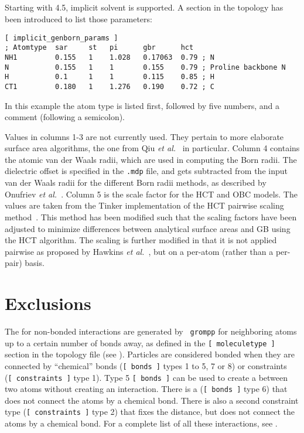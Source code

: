 \subsection{}
Starting with {\gromacs} 4.5, implicit solvent is supported. A section in the
topology has been introduced to list those parameters:

{\small
\begin{verbatim}
[ implicit_genborn_params ]
; Atomtype  sar     st   pi      gbr      hct
NH1         0.155   1    1.028   0.17063  0.79 ; N
N           0.155   1    1       0.155    0.79 ; Proline backbone N
H           0.1     1    1       0.115    0.85 ; H
CT1         0.180   1    1.276   0.190    0.72 ; C
\end{verbatim}}

In this example the atom type is listed first, followed by five
numbers, and a comment (following a semicolon).

Values in columns 1-3 are not currently used. They pertain to more
elaborate surface area algorithms, the one from Qiu {\em et al.}~\cite{Still97} in
particular.  Column 4 contains the atomic van der Waals radii, which are used
in computing the Born radii. The dielectric offset is specified in
the {\tt *.mdp} file, and gets subtracted from the input van der Waals radii for the different
Born radii methods, as described by Onufriev {\em et al.}~\cite{Case04}.  Column 5 is the 
scale factor for the HCT and OBC models. The values are taken from the Tinker implementation of 
the HCT pairwise scaling method~\cite{Truhlar96}.  This method has been modified such that the
scaling factors have been adjusted to minimize differences between analytical surface areas and
GB using the HCT algorithm.  The scaling is further modified in that it is not applied pairwise
as proposed by Hawkins {\em et al.}~\cite{Truhlar96}, but on a per-atom (rather than a per-pair) 
basis.



\section{Exclusions}
\label{sec:excl}
The  for non-bonded interactions are generated by {\tt
grompp} for neighboring atoms up to a certain number of bonds away, as
defined in the {\tt [~moleculetype~]} section in the topology file
(see ). Particles are considered bonded when they are
connected by ``chemical'' bonds ({\tt [~bonds~]} types 1 to 5, 7 or 8)
or constraints ({\tt [~constraints~]} type 1).
Type 5 {\tt [~bonds~]} can be used to create a 
between two atoms without creating an interaction.
There is a 
({\tt [~bonds~]} type 6) that does not connect the atoms by a chemical bond.
There is also a second constraint type ({\tt [~constraints~]} type 2)
that fixes the distance, but does not connect
the atoms by a chemical bond.
For a complete list of all these interactions, see .

